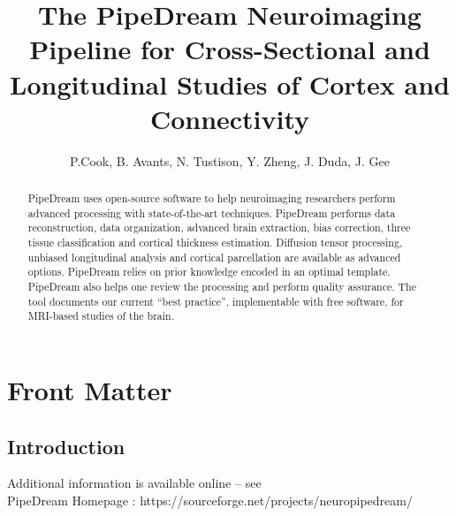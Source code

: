 \documentclass{InsightArticle}
\title{The PipeDream Neuroimaging Pipeline for Cross-Sectional and Longitudinal Studies of Cortex and Connectivity}
\author{P.Cook, B. Avants, N. Tustison, Y. Zheng, J. Duda, J. Gee}
\begin{document}
%
% 


\ifpdf
\else
\fi


\maketitle


\ifhtml
\chapter*{Front Matter\label{front}}
\fi



\begin{abstract}
\noindent PipeDream uses open-source software to help neuroimaging researchers perform advanced processing with state-of-the-art techniques.  PipeDream performs data reconstruction, data organization, advanced brain extraction, bias correction, three tissue classification and cortical thickness estimation.  Diffusion tensor processing, unbiased longitudinal analysis and cortical parcellation are available as advanced options.  PipeDream relies on prior knowledge encoded in an optimal template.  PipeDream also helps one review the processing and perform quality assurance.  The tool documents our current ``best practice'', implementable with free software, for MRI-based studies of the brain.
\end{abstract}


\tableofcontents
\newpage
\section*{Introduction}
Additional information is available online -- see 
\href{https://sourceforge.net/projects/neuropipedream/}\\{PipeDream
  Homepage :
  https://sourceforge.net/projects/neuropipedream/} 
\end{document}
